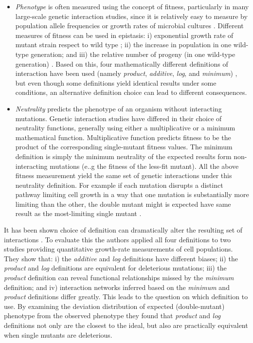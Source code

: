 \begin{itemize}
	\item \textit{Phenotype} is often measured using the concept of fitness, particularly in many large-scale genetic interaction studies, since it is relatively easy to measure by population allele frequencies or growth rates of microbial cultures \cite{mani2008defining}. 
Different measures of fitness can be used in epistasis: i) exponential growth rate of mutant strain respect to wild type ; ii) the increase in population in one wild-type generation; and iii) the relative number of progeny (in one wild-type generation) \cite{mani2008defining}.
Based on this, four mathematically different definitions of interaction have been used (namely \textit{product}, \textit{additive}, \textit{log}, and \textit{minimum}) \cite{mani2008defining}, but even though some definitions yield identical results under some conditions, an alternative definition choice can lead to different consequences\cite{mani2008defining}.

	\item \textit{Neutrality} predicts the phenotype of an organism without interacting mutations. 
Genetic interaction studies have differed in their choice of neutrality functions, generally using either a multiplicative or a minimum mathematical function. Multiplicative function predicts fitness to be the product of the corresponding single-mutant fitness values. 
	The minimum definition is simply the minimum neutrality of the expected results form non-interacting mutations (e..g the fitness of the less-fit mutant). 
All the above fitness measurement yield the same set of genetic interactions under this neutrality definition. 
For example if each mutation disrupts a distinct pathway limiting cell growth in a way that one mutation is substantially more limiting than the other, the double mutant might is expected have same result as the most-limiting single mutant \cite{mani2008defining}.
\end{itemize}

It has been shown choice of definition can dramatically alter the resulting set of interactions \cite{mani2008defining}.
To evaluate this the authors applied all four definitions to two studies providing quantitative growth-rate measurements of cell populations. 
They show that: 
i) the \textit{additive} and \textit{log} definitions have different biases; 
ii) the \textit{product} and \textit{log} definitions are equivalent for deleterious mutations; 
iii) the \textit{product} definition can reveal functional relationships missed by the \textit{minimum} definition; and 
iv) interaction networks inferred based on the \textit{minimum} and \textit{product} definitions differ greatly. 
This leads to the question on which definition to use. 
By examining the deviation distribution of expected (double-mutant) phenotype from the observed phenotype they found that \textit{product} and \textit{log} definitions not only are the closest to the ideal, but also are practically equivalent when single mutants are deleterious.

